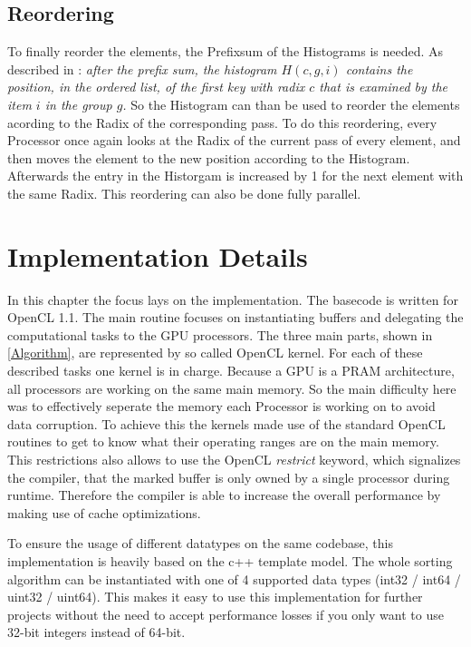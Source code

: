 \documentclass{llncs}
\begin{document}
\subsection{Reordering}
To finally reorder the elements, the Prefixsum of the Histograms is needed. As described in \cite{ocl-radix-helluy}: \textit{after the prefix sum, the histogram $H(c, g, i)$ contains the position, in the ordered list, of the first key with radix $c$ that is examined by the item $i$ in the group $g$.} So the Histogram can than be used to reorder the elements acording to the Radix of the corresponding pass. To do this reordering, every Processor once again looks at the Radix of the current pass of every element, and then moves the element to the new position according to the Histogram. Afterwards the entry in the Historgam is increased by 1 for the next element with the same Radix. This reordering can also be done fully parallel.

\newpage
\section{Implementation Details}
In this chapter the focus lays on the implementation. The basecode is written for OpenCL 1.1. The main routine focuses on instantiating buffers and delegating the computational tasks to the GPU processors. The three main parts, shown in \ref{Algorithm}, are represented by so called OpenCL kernel. For each of these described tasks one kernel is in charge. Because a GPU is a PRAM architecture, all processors are working on the same main memory. So the main difficulty here was to effectively seperate the memory each Processor is working on to avoid data corruption. To achieve this the kernels made use of the standard OpenCL routines to get to know what their operating ranges are on the main memory. This restrictions also allows to use the OpenCL \textit{restrict} keyword, which signalizes the compiler, that the marked buffer is only owned by a single processor during runtime. Therefore the compiler is able to increase the overall performance by making use of cache optimizations.

To ensure the usage of different datatypes on the same codebase, this implementation is heavily based on the c++ template model. The whole sorting algorithm can be instantiated with one of 4 supported data types (int32 / int64 / uint32 / uint64). This makes it easy to use this implementation for further projects without the need to accept performance losses if you only want to use 32-bit integers instead of 64-bit.
\end{document}
